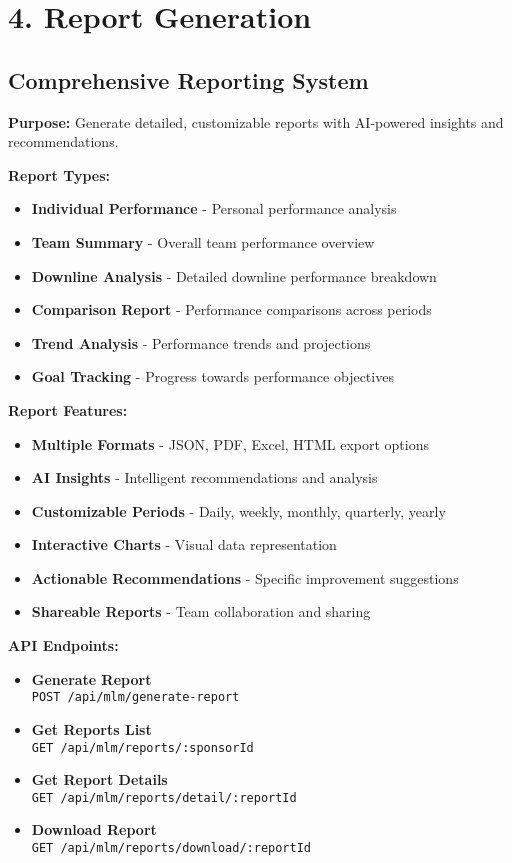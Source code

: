 \documentclass[12pt,a4paper]{article}
\newcommand{\apiendpoint}[2]{\textbf{#1} \\ \texttt{#2}}
\begin{document}
\section{4. Report Generation}

\subsection{Comprehensive Reporting System}
\textbf{Purpose:} Generate detailed, customizable reports with AI-powered insights and recommendations.

\textbf{Report Types:}
\begin{itemize}
    \item \textbf{Individual Performance} - Personal performance analysis
    \item \textbf{Team Summary} - Overall team performance overview
    \item \textbf{Downline Analysis} - Detailed downline performance breakdown
    \item \textbf{Comparison Report} - Performance comparisons across periods
    \item \textbf{Trend Analysis} - Performance trends and projections
    \item \textbf{Goal Tracking} - Progress towards performance objectives
\end{itemize}

\textbf{Report Features:}
\begin{itemize}
    \item \textbf{Multiple Formats} - JSON, PDF, Excel, HTML export options
    \item \textbf{AI Insights} - Intelligent recommendations and analysis
    \item \textbf{Customizable Periods} - Daily, weekly, monthly, quarterly, yearly
    \item \textbf{Interactive Charts} - Visual data representation
    \item \textbf{Actionable Recommendations} - Specific improvement suggestions
    \item \textbf{Shareable Reports} - Team collaboration and sharing
\end{itemize}

\textbf{API Endpoints:}
\begin{itemize}
    \item \apiendpoint{Generate Report}{POST /api/mlm/generate-report}
    \item \apiendpoint{Get Reports List}{GET /api/mlm/reports/:sponsorId}
    \item \apiendpoint{Get Report Details}{GET /api/mlm/reports/detail/:reportId}
    \item \apiendpoint{Download Report}{GET /api/mlm/reports/download/:reportId}
\end{itemize}
\end{document}
